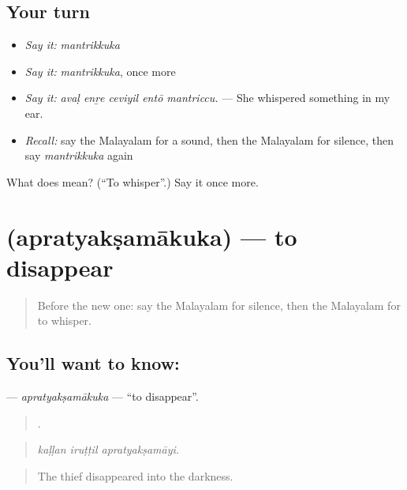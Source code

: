 \subsection*{Your turn}
\begin{itemize}
\raggedright
  \item \emph{Say it:} \emph{mantrikkuka}
  \item \emph{Say it:} \emph{mantrikkuka}, once more
  \item \emph{Say it:} \emph{avaḷ enṟe ceviyil entō mantriccu.} — She whispered something in my ear.
  \item \emph{Recall:} say the Malayalam for a sound, then the Malayalam for silence, then say \emph{mantrikkuka} again
\end{itemize}

\begin{tcolorbox}[breakable,colback=teal!4,colframe=teal!35!black,title={Before you move on}]
What does  mean? (\textquotedblleft{}To whisper\textquotedblright{}.) Say it once more.
\end{tcolorbox}
\section[\texorpdfstring{\ml{അപ്രത്യക്ഷമാകുക} (apratyakṣamākuka)}{അപ്രത്യക്ഷമാകുക (apratyakṣamākuka)}]{ (apratyakṣamākuka) — to disappear}

\label{lesson:ML-C381-apratyaksamakuka}



\begin{quote}
Before the new one: say the Malayalam for silence, then the Malayalam for to whisper.
\end{quote}

\subsection*{You'll want to know: }
\textbf{} — \emph{apratyakṣamākuka} — \textquotedblleft{}to disappear\textquotedblright{}.

\begin{quote}
  .
\end{quote}

\begin{quote}
\emph{kaḷḷan iruṭṭil apratyakṣamāyi.}
\end{quote}

\begin{quote}
The thief disappeared into the darkness.
\end{quote}

